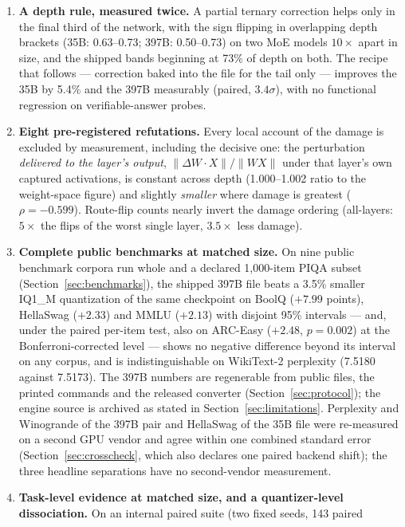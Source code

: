 \documentclass[10pt]{article} %
\begin{document}
\begin{enumerate}
\item \textbf{A depth rule, measured twice.} A partial ternary correction helps only
   in the final third of the network, with the sign flipping in overlapping
   depth brackets (35B: 0.63--0.73; 397B: 0.50--0.73) on two MoE models
   $10\times$ apart in size, and the shipped bands beginning at 73\% of depth
   on both. The recipe that
   follows --- correction baked into the file for the tail only --- improves the
   35B by 5.4\% and the 397B measurably (paired, $3.4\sigma$), with no functional
   regression on verifiable-answer probes.
\item \textbf{Eight pre-registered refutations.} Every local account of the damage is
   excluded by measurement, including the decisive one: the perturbation
   \emph{delivered to the layer's output}, $\|\Delta W \cdot X\|/\|W X\|$ under that layer's own
   captured activations, is constant across depth (1.000--1.002 ratio to the
   weight-space figure) and slightly \emph{smaller} where damage is greatest
   ($\rho = -0.599$). Route-flip counts nearly invert the damage ordering
   (all-layers: $5\times$ the flips of the worst single layer, $3.5\times$ less damage).
\item \textbf{Complete public benchmarks at matched size.} On nine public
   benchmark corpora run whole and a declared 1,000-item PIQA subset
   (Section~\ref{sec:benchmarks}), the shipped
   397B file beats a 3.5\% smaller IQ1\_M quantization of the same checkpoint
   on BoolQ ($+7.99$ points), HellaSwag ($+2.33$) and MMLU ($+2.13$) with
   disjoint 95\% intervals --- and, under the paired per-item test, also on
   ARC-Easy ($+2.48$, $p = 0.002$) at the Bonferroni-corrected level --- shows
   no negative difference beyond its interval on any corpus, and is
   indistinguishable on WikiText-2 perplexity (7.5180 against 7.5173). The 397B
   numbers are regenerable from public files, the printed commands and the
   released converter (Section~\ref{sec:protocol}); the engine source is
   archived as stated in Section~\ref{sec:limitations}. Perplexity and
   Winogrande of the 397B pair and HellaSwag of the 35B file were re-measured
   on a second GPU vendor and agree within one combined standard error
   (Section~\ref{sec:crosscheck}, which also declares one paired backend
   shift); the three headline separations have no second-vendor measurement.
\item \textbf{Task-level evidence at matched size, and a quantizer-level
   dissociation.} On an internal paired suite (two fixed seeds, 143 paired

\end{enumerate}
\end{document}

